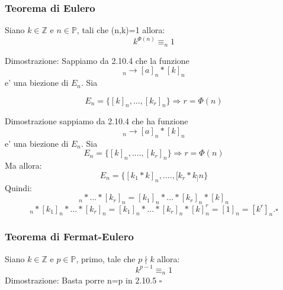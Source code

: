 \documentclass{article}
\begin{document}
     \subsubsection{Teorema di Eulero}
     \begin{flushleft}
       Siano $k \in \mathbb{Z}$ e $n \in \mathbb{P}$, tali che (n,k)=1 allora:
       \begin{equation}
         k^{\Phi(n)} \equiv_n 1 
       \end{equation}
     \end{flushleft}
     \begin{flushleft}
       Dimostrazione: Sappiamo da 2.10.4 che la funzione 
       \begin{equation}
         [a]_n \to [a]_n*[k]_n
       \end{equation}
       e' una biezione di $E_n$. Sia
     \end{flushleft}
     \begin{equation}
       E_n = \{ [k]_n,...,[k_r]_n\} \Rightarrow r=\Phi (n)
     \end{equation}
     \begin{flushleft}
      Dimostrazione sappiamo da 2.10.4 che ha funzione
       \begin{equation}
         [a]_n \to [a]_n*[k]_n
       \end{equation}
       e' una biezione di $E_n$. Sia
       \begin{equation}
         E_n = \{ [k]_n,....,[k_r]_n\} \Rightarrow r = \Phi (n)
       \end{equation}
       Ma allora:
       \begin{equation}
         E_n = \{ [k_1 * k]_n,....,[k_r * k_]n\} 
       \end{equation}
       Quindi:
       \begin{equation}
         [k_1]_n*...*[k_r]_n=[k_1]_n*...*[k_r]_n*[k]_n
       \end{equation}
       \begin{equation}
         [1]_n*[k_1]_n*...*[k_r]_n=[k_1]_n*...*[k_r]_n*[k]^r_n = [1]_n=[k^r]_n. \square
       \end{equation}
     \end{flushleft}
     \subsubsection{Teorema di Fermat-Eulero}
     \begin{flushleft}
       Siano $k \in \mathbb{Z}$ e $p \in \mathbb{P}$, primo, tale che $p \nmid k$ allora:
       \begin{equation}
         k^{p-1} \equiv_n 1
       \end{equation}
       Dimostrazione: Basta porre n=p in 2.10.5 $\square$
     \end{flushleft}
\end{document}
